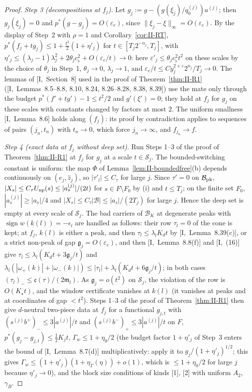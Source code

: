 \documentclass[10pt]{amsart}
\theoremstyle{definition}
\theoremstyle{remark}
\newcommand{\sgn}{\operatorname{sign}}
\newcommand{\zh}{\hat z}
\begin{document}
\begin{proof}
\emph{Step 3 (decompositions at $f_j$).}  Let $g_j:=g-(g(\xi_j)/q^{(j)}_0)
a^{(j)}$; then $g_j(\xi_j)=0$ and $p^*(g-g_j)=O(\varepsilon_e)$, since
$\|\xi_j-\xi\|_\infty=O(\varepsilon_e)$.  By the display of Step~2 with
$\rho=1$ and Corollary~\ref{cor:II-RT}, $p^*(f_j+tg_j)\le1+\frac{t^2}2
(1+\eta'_j)$ for $t\in[T_j2^{-n_j},T_j]$, with $\eta'_j\le(\lambda_j-1)
\lambda_j^2+2\theta_jc_\flat^2+O(\varepsilon_e/t)\to0$: here $\varepsilon'_j
\le\theta_jc_\flat^2t^2$ on these scales by the choice of $\theta_j$ in
Step~1, $\theta_j\to0$, $\lambda_j\to1$, and $\varepsilon_e/t\le Cy_j^{2+
\varepsilon}2^{n_j}/T_j\to0$.  The lemmas of
[I,~Section~8] used in the proof of Theorem~\ref{thm:II-R1} ([I,~Lemmas~8.5--8.8,
8.10, 8.24, 8.26--8.28, 8.38, 8.39]) use the mate only through the budget
$p^*(f'+tg')-1\le t^2/2$ and $g'(\xi')=0$; they hold at $f_j$ for $g_j$ on these
scales with constants changed by factors at most $2$.  The uniform
smallness [I,~Lemma~8.6] holds along $(f_j)$: its proof by contradiction
applies to sequences of pairs $(j_n,t_n)$ with $t_n\to0$, which force
$j_n\to\infty$, and $f_{j_n}\to f$.

\emph{Step 4 (exact data at $f_j$ without deep set).}  Run Steps 1--3 of the
proof of Theorem~\ref{thm:II-R1} at $f_j$ for $g_j$ at a scale $t\in\mathcal
S_j$.  The bounded-switching constant is uniform: the map $\Phi$ of
Lemma~\ref{lem:II-boundedfree}(b) depends continuously on $(e_j,\zh_j)$, so
$|\tau'_l|\le C_\tau$ for large $j$.  Since $\tau'=0$ on $\mathcal B_{\rm
pk}$, $|X_s|\le C_\tau U_{\rm np}(s)\le|a^{(j)}_s|/(2t)$ for $s\in F\setminus
F_0$ by (i) and $t\le T_j$; on the finite set $F_0$, $|a^{(j)}_s|\ge|a_s|/4$
and $|X_s|\le C_\tau|\mathcal B|\le|a_s|/(2T_j)$ for large $j$.  Hence the deep
set is empty at every scale of $\mathcal S_j$.  The bad carriers of
$\mathcal B_K$ at degenerate peaks with $\sgn w(k(l))=-\epsilon_l$ are handled
as follows: their row $\tau_l=0$ of the cone is kept; at $f_j$, $k(l)$ is
either a peak, and then $\tau_l\le\lambda_lK_dt$ by [I,~Lemma~8.39(c)], or a
strict non-peak of gap $\mathfrak g_j=O(\varepsilon_e)$, and then
[I,~Lemma~8.8(f)] and [I,~(16)] give $\tau_l\le\lambda_l(K_dt+3\mathfrak g_j/t)$
and $\lambda_l(|\omega_+(k)|+|\omega_-(k)|)\le|\tau_l|+\lambda_l(K_dt+6\mathfrak
g_j/t)$; in both cases $(\tau_l)_-\le\mathfrak c(\tau)/(2\mathfrak m_l)$.  As
$\mathfrak g_j=o(t^2)$ on $\mathcal S_j$, the violation of the row is
$O(K_\star t)$, and the window certificate vanishes at $k(l)$ (it vanishes at
peaks and at coordinates of gap $<t^2$).  Steps 1--3 of the proof of
Theorem~\ref{thm:II-R1} then give $d$-neutral two-piece data at $f_j$ for a
functional $g_{j,t}$ with $(s^{(j)}b^+)_-\le3|a^{(j)}|/t$ and $(s^{(j)}b^-)_+\le
3|a^{(j)}|/t$ on $F$, $p^*(g_j-g_{j,t})\le\frac12K_jt$, $\Gamma_w\le1+\eta_0/2$
(the budget factor $1+\eta'_j$ of Step~3 enters the bound of
[I,~Lemma~8.7(d)] multiplicatively: apply it to $g_j/(1+\eta'_j)^{1/2}$; this
gives $\Gamma_w\le(1+\eta'_j)(1+\eta_\Gamma(\eta))+o(1)$, which is $\le1+\eta_0/2$
for large $j$ because $\eta'_j\to0$),
and the block size conditions of kinds [1], [2] with uniform $A_2$,
$\gamma_B$.


\end{proof}
\end{document}
